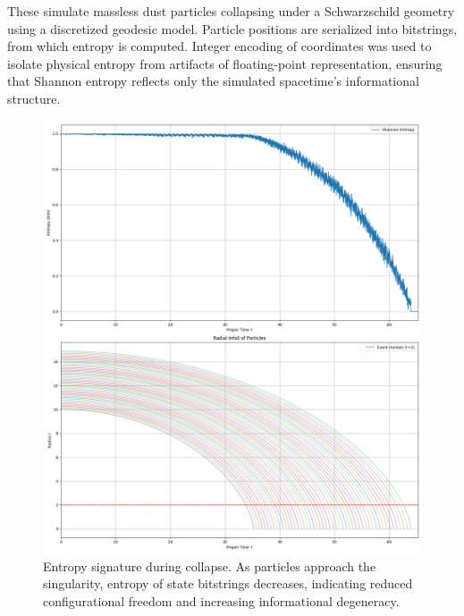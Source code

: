 \documentclass[11pt]{article}
\begin{document}
These simulate massless dust particles collapsing under a Schwarzschild geometry using a discretized geodesic model. Particle positions are serialized into bitstrings, from which entropy is computed. Integer encoding of coordinates was used to isolate physical entropy from artifacts of floating-point representation, ensuring that Shannon entropy reflects only the simulated spacetime's informational structure.


\begin{figure}[h!]
  \centering
  \includegraphics[width=\textwidth]{figures/schwarzschild_entropy_signature.png}
  \caption{Entropy signature during collapse. As particles approach the singularity, entropy of state bitstrings decreases, indicating reduced configurational freedom and increasing informational degeneracy.}
  \label{fig:schwarzschild_entropy}
\end{figure}
\end{document}
